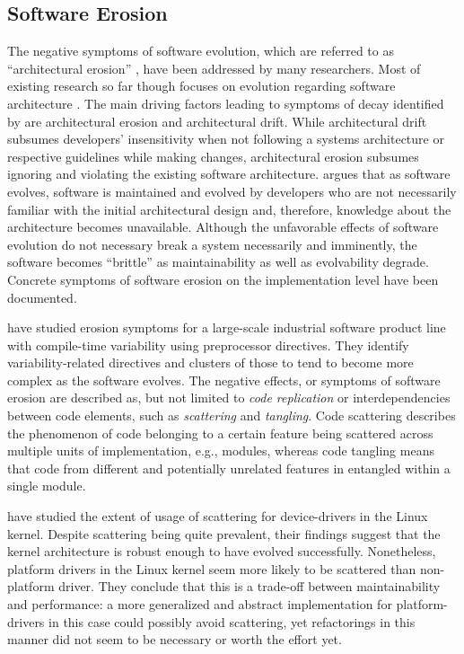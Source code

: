 \subsection{Software Erosion}
The negative symptoms of software evolution, which are referred to as
``architectural erosion'' \citep{breivold_systematic_2012}, have
been addressed by many researchers.
Most of existing research so far though focuses on evolution regarding software architecture
\citep{breivold_systematic_2012}. The main driving factors leading to symptoms of decay
identified by \cite{perry_software_1991} are architectural erosion and
architectural drift. While architectural drift subsumes developers'
insensitivity when not following a systems architecture or respective guidelines while making changes, architectural erosion subsumes ignoring and violating the existing software
architecture. \cite{parnas_software_1994} argues that as software evolves, software is maintained
and evolved by developers who are not necessarily familiar with the initial
architectural design and, therefore, knowledge about the architecture becomes
unavailable. Although the unfavorable effects of software evolution do not necessary break a
system necessarily and imminently, the software becomes ``brittle'' \citep{perry_software_1991}
as maintainability as well as evolvability degrade. Concrete  symptoms of software
erosion on the implementation level have been documented. 

\cite{zhang_variability_2013} have studied erosion symptoms for a large-scale
industrial software product line with compile-time variability using
preprocessor directives.
They identify variability-related directives and clusters of those to tend to become more
complex as the software evolves. The negative effects, or symptoms of software
erosion are described as, but not limited to \emph{code replication} or
interdependencies between code elements, such as \emph{scattering} and
\emph{tangling}. Code scattering describes the phenomenon of code belonging to
a certain feature being scattered across multiple units of implementation,
e.g., modules, whereas code tangling means that code from different and
potentially unrelated features in entangled within a single module.

\cite{passos_feature_2015} have studied the extent of usage of scattering for device-drivers
in the Linux kernel. Despite scattering being quite prevalent, their
findings suggest that the kernel architecture is robust enough to have evolved
successfully. Nonetheless, platform drivers in the Linux kernel seem more
likely to be scattered than non-platform driver. They conclude that this is a
trade-off between maintainability and performance: a more generalized and
abstract implementation for platform-drivers in this case could possibly avoid
scattering, yet refactorings in this manner did not seem to be necessary or
worth the effort yet.

